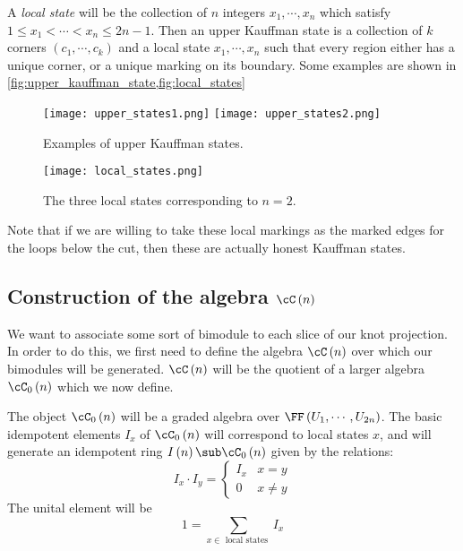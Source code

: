 \documentclass{amsproc}
\begin{document}
A \emph{local state} will be the collection of $n$ integers $x_1 , \cdots , x_n$
which satisfy $1 \leq x_1 < \cdots < x_n \leq 2n-1$.
Then an upper Kauffman state is a collection of $k$ corners $\left( c_1 , \cdots , c_k \right)$
and a local state $x_1 , \cdots , x_n$ such that every region either has a unique corner, 
or a unique marking on its boundary.
Some examples are shown in \cref{fig:upper_kauffman_state,fig:local_states}

\begin{figure}
\texttt{[image: upper\_states1.png]}
\texttt{[image: upper\_states2.png]}
\caption{Examples of upper Kauffman states.}
\label{fig:upper_kauffman_state}
\end{figure}

\begin{figure}
\texttt{[image: local\_states.png]}
\caption{The three local states corresponding to $n = 2$.}
\label{fig:local_states}
\end{figure}

Note that if we are willing to take these local markings as the marked edges for the loops
below the cut, then these are actually honest Kauffman states.


\subsection{Construction of the algebra $\cC\left( n \right)$}

We want to associate some sort of bimodule to each slice of our knot
projection. In order to do this, we first need to define the algebra $\cC\left( n \right)$
over which our bimodules will be generated.
$\cC\left( n \right)$ will be the quotient of a larger algebra $\cC_0\left( n \right)$ which we
now define.

The object $\cC_0\left( n \right)$ will be a graded algebra over
$\FF\left( U_1 , \cdots , U_{2n} \right)$.
The basic idempotent elements $I_x$ 
of $\cC_0\left( n \right)$ will correspond to local states $x$, and 
will generate an idempotent ring $I\left( n \right) \sub \cC_0\left( n \right)$
given by the relations:
\begin{equation}
I_x \cdot I_y = 
\begin{cases}
I_x & x = y \\
0 & x\neq y
\end{cases}
\end{equation}
The unital element will be
\begin{equation}
1 = \sum_{x\in \text{ local states }} I_x
\end{equation}
\end{document}
